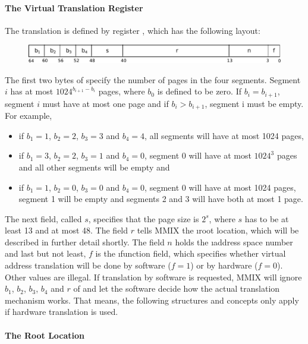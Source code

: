 \paragraph{The Virtual Translation Register}

The translation is defined by register , which has the following layout:
\begin{figure}[H]
	\centering
	\includegraphics[width=\textwidth]{img/rV-crop.pdf}
\end{figure}
\vspace{-20pt}
\noindent The first two bytes of  specify the number of pages in the four segments. Segment $i$ has at most $1024^{b_{i+1}-b_i}$ pages, where $b_0$ is defined to be zero. If $b_i = b_{i+1}$, segment $i$ must have at most one page and if $b_i > b_{i+1}$, segment i must be empty. For example,
\begin{itemize}
	\item if $b_1 = 1$, $b_2 = 2$, $b_3 = 3$ and $b_4 = 4$, all segments will have at most 1024 pages,
	\item if $b_1 = 3$, $b_2 = 2$, $b_3 = 1$ and $b_4 = 0$, segment 0 will have at most $1024^3$ pages and all other segments will be empty and
	\item if $b_1 = 1$, $b_2 = 0$, $b_3 = 0$ and $b_4 = 0$, segment 0 will have at most 1024 pages, segment 1 will be empty and segments 2 and 3 will have both at most 1 page.
\end{itemize}
The next field, called $s$, specifies that the page size is $2^s$, where $s$ has to be at least 13 and at most 48. The field $r$ tells MMIX the \i{root location}, which will be described in further detail shortly. The field $n$ holds the \i{address space number} and last but not least, $f$ is the \i{function field}, which specifies whether virtual address translation will be done by software ($f=1$) or by hardware ($f=0$). Other values are illegal. If translation by software is requested, MMIX will ignore $b_1$, $b_2$, $b_3$, $b_4$ and $r$ of  and let the software decide how the actual translation mechanism works. That means, the following structures and concepts only apply if hardware translation is used. \citep[pg. 36]{mmix-doc}

\paragraph{The Root Location}

